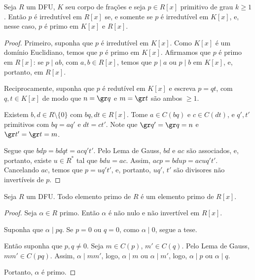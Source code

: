     \begin{prop}
        Seja $R$ um DFU, $K$ seu corpo de frações e seja $p\in R[x]$ primitivo de grau $k\geq 1$.
        Então $p$ é irredutível em $R[x]$ se, e somente se $p$ é irredutível em $K[x]$, e, nesse caso, $p$ é primo em $K[x]$ e $R[x]$.
    \end{prop}
    \begin{proof}
        Primeiro, suponha que $p$ é irredutível em $K[x]$. Como $K[x]$ é um domínio Euclidiano, temos que $p$ é primo em $K[x]$. Afirmamos que $p$ é primo em $R[x]$: se $p\mid ab$, com $a, b \in R[x]$, temos que $p\mid a$ ou $p\mid b$ em $K[x]$, e, portanto, em $R[x]$.

        Reciprocamente, suponha que $p$ é redutível em $K[x]$ e escreva $p=qt$, com $q, t \in K[x]$ de modo que $n=\gr q$ e $m=\gr t$ são ambos $\geq 1$.

        Existem $b, d\in R\setminus \{0\}$ com $bq, dt \in R[x]$. Tome $a \in C(bq)$ e $c \in C(dt)$, e $q', t'$ primitivos com $bq=aq'$ e $dt=ct'$.
        Note que $\gr q'=\gr q=n$ e $\gr t'=\gr t=m$.

        Segue que $bdp=bdqt=acq't'$. Pelo Lema de Gauss, $bd$ e $ac$ são associados, e, portanto, existe $u \in R^*$ tal que $bdu=ac$. Assim, $acp=bdup=acuq't'$. Cancelando $ac$, temos que $p=uq't'$, e, portanto, $uq'$, $t'$ são divisores não invertíveis de  $p$.
    \end{proof}
    \begin{lemma}
    Seja $R$ um DFU. Todo elemento primo de $R$ é um elemento primo de $R[x]$.
    \end{lemma}
    \begin{proof}
        Seja $\alpha \in R$ primo. Então $\alpha$ é não nulo e não invertível em $R[x]$.

        Suponha que $\alpha\mid pq$.
        Se $p=0$ ou $q=0$, como $\alpha\mid 0$, segue a tese.
        
        Então suponha que $p, q \neq 0$. Seja $m\in C(p)$, $m'\in C(q)$. Pelo Lema de Gauss, $mm'\in C(pq)$. Assim, $\alpha\mid mm'$, logo, $\alpha\mid m$ ou $\alpha\mid m'$, logo, $\alpha\mid p$ ou $\alpha\mid q$.

        Portanto, $\alpha$ é primo.
    \end{proof}

